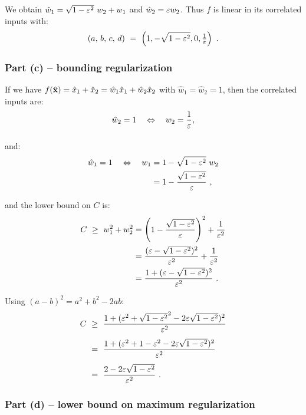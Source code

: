 We obtain $\hat w_1 = \sqrt{1 - \eps^2}\ w_2 + w_1$ and $\hat w_2 = \varepsilon w_2$.
Thus $f$ is linear in its correlated inputs with:
\begin{align*}
  (a,\, b,\, c,\, d) \ = \ \left(1, -\sqrt{1 - \varepsilon^2}, 0, \tfrac{1}{\varepsilon}\right)\ .
\end{align*}

\subsubsection{Part (c) -- bounding regularization}

If we have $f(\hat{\mathbf{x}}) = \hat x_1 + \hat x_2 = \hat w_1 \hat x_1 + \hat w_2
\hat x_2$ with $\hat w_1 = \hat w_2 = 1$, then the correlated inputs are:
\begin{align*}
  \hat w_2 = 1 &\quad \Leftrightarrow\quad w_2 = \frac{1}{\varepsilon},\\[8pt]
\end{align*}
and:
\begin{align*}
  \hat w_1 = 1 \quad \Leftrightarrow\quad w_1 &= 1 - \sqrt{1 - \varepsilon^2}\ w_2\\
                                              &= 1 - \frac{\sqrt{1 -
                                              \varepsilon^2}}{\varepsilon}\ ,
\end{align*}

and the lower bound on $C$ is:
\begin{align*}
  C \ \geq\  w_1^2 + w_2^2 &= \left(1 - \frac{\sqrt{1 - \varepsilon^2}}{\varepsilon}\right)^2 +
  \frac{1}{\varepsilon^2}\\
                           &= \frac{(\varepsilon - \sqrt{1 - \varepsilon^2})^2}{\varepsilon^2} +
  \frac{1}{\varepsilon^2}\\
                           &= \frac{1 + (\varepsilon - \sqrt{1 - \varepsilon^2})^2}{\varepsilon^2}\ .
\end{align*}

Using $(a - b)^2 = a^2 + b^2 - 2ab$:
\begin{align*}
  C \ &\geq \ \frac{1 + (\varepsilon^2 + \sqrt{1 - \varepsilon^2}^2 - 2\varepsilon\sqrt{1 - \varepsilon^2})^2}{\varepsilon^2}\\[4pt]
  &= \ \frac{1 + (\varepsilon^2 + 1 - \varepsilon^2 - 2\varepsilon\sqrt{1 - \varepsilon^2})^2}{\varepsilon^2}\\[4pt]
  &= \ \frac{2 - 2\varepsilon\sqrt{1 - \varepsilon^2}}{\varepsilon^2}\ .
\end{align*}

\subsubsection{Part (d) -- lower bound on maximum regularization}


